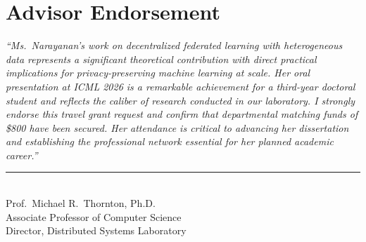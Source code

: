 \section{\faPen\hspace{7pt}Advisor Endorsement}

\begin{sigbox}
\vspace{-2pt}
\textit{``Ms.\ Narayanan's work on decentralized federated learning with heterogeneous data represents a significant theoretical contribution with direct practical implications for privacy-preserving machine learning at scale. Her oral presentation at ICML 2026 is a remarkable achievement for a third-year doctoral student and reflects the caliber of research conducted in our laboratory. I strongly endorse this travel grant request and confirm that departmental matching funds of \$800 have been secured. Her attendance is critical to advancing her dissertation and establishing the professional network essential for her planned academic career.''}

\vspace{12pt}
\begin{flushright}
\begin{minipage}{0.48\textwidth}
\rule{\linewidth}{0.4pt}\\[3pt]
{\small\color{medium}Prof.\ Michael R.\ Thornton, Ph.D.}\\[1pt]
{\small\color{medium}Associate Professor of Computer Science}\\[1pt]
{\small\color{medium}Director, Distributed Systems Laboratory}
\end{minipage}
\end{flushright}
\end{sigbox}

